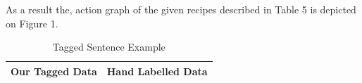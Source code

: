 As a result the, action graph of the given recipes described in Table 5 is depicted on Figure 1.  

\begin{table}[]
\centering
\caption{Tagged Sentence Example}
\label{my-label}
\begin{tabular}{|l|l|}
\hline
\textbf{Our Tagged Data}                                                                                                                                                                                                                                                                                                                                                                                                                                                  & \textbf{Hand Labelled Data}                                                                                                                                                                                                                                                                                                                                                                                                                                                     \\ \hline

\end{tabular}
\end{table}

